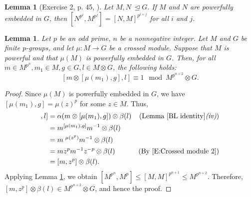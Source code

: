 \documentclass[12pt]{elsarticle}
\newtheorem{lemma}[theorem]{Lemma}
\newtheorem*{main corollary*}{Main Corollary}
\theoremstyle{definition}
\begin{document}
\begin{lemma}[Exercise 2, p. 45, \cite{DDMS99}]\label{Shalev identity}Let $M,N\ \unlhd  G.$ If $M$ and $N$ are powerfully embedded in $G$, then $[N^{p^i}, M^{p^j}]=[N,M]^{p^{i+j}}$ for all $i$ and $j$.
    
\end{lemma}
\begin{lemma}\label{commutator in recursive formula}
    Let $p$ be an odd prime, $n$ be a nonnegative integer. Let $M$ and $G$ be finite $p$-groups, and let $\mu:M\to G$ be a crossed module. Suppose that $M$ is powerful and that $\mu(M)$ is powerfully embedded in $G$. Then, for all $m \in M^{p^n}, m_1\in M, g\in G, l\in M\otimes G$, the following holds:\[[m\otimes [\mu(m_1),g], l ]\equiv 1\mod M^{p^{n+2}}\otimes G.\] 
\end{lemma}
\begin{proof}Since $\mu(M)$ is powerfully embedded in $G$, we have $[\mu(m_1),g]=\mu(z)^p$ for some $z\in M$. Thus,\begin{align*}
        [m\otimes [\mu(m_1),g], l ]&=\alpha(m\otimes [\mu(m_1),g])\otimes \beta(l) & \mbox{(Lemma } \ref{BL identity}\textit{(iv)})\\
        &= m^ {[\mu(m_1),g]}m^{-1}\otimes \beta(l)\\
        &= m\;^{\mu(z^p)}m^{-1}\otimes \beta(l)\\
        &=mz^pm^{-1}z^{-p}\otimes \beta(l) & \mbox{(By } \eqref{E:Crossed module 2})\\
        &=[m,z^p]\otimes\beta(l).
    \end{align*}Applying Lemma \ref{Shalev identity}, we obtain $[M^{p^n},M^{p}] \leq [M,M]^{p^{n+1}}\leq M^{p^{n+2}}.$ Therefore, $[m,z^p]\otimes\beta(l)\in M^{p^{n+2}}\otimes G$, and hence the proof.
\end{proof}
\end{document}
